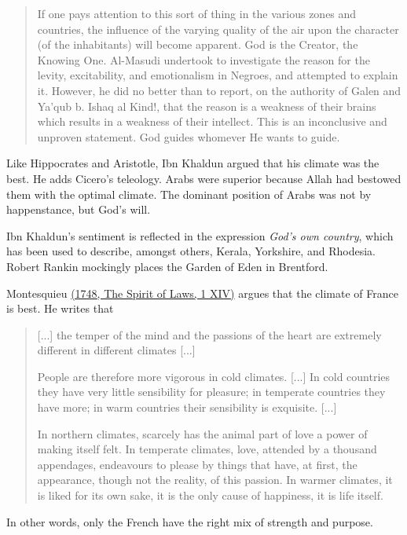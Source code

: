\begin{quote}
If one pays attention to this sort of thing in the various zones and countries, the influence of the varying quality of the air upon the character (of the inhabitants) will become apparent. God is the Creator, the Knowing One. Al-Masudi undertook to investigate the reason for the levity, excitability, and emotionalism in Negroes, and attempted to explain it. However, he did no better than to report, on the authority of Galen and Ya'qub b. Ishaq al Kind!, that the reason is a weakness of their brains which results in a weakness of their intellect. This is an inconclusive and unproven statement. God guides whomever He wants to guide.
\end{quote}
Like Hippocrates and Aristotle, Ibn Khaldun argued that his climate was the best. He adds Cicero's teleology. Arabs were superior because Allah had bestowed them with the optimal climate. The dominant position of Arabs was not by happenstance, but God's will.

Ibn Khaldun's sentiment is reflected in the expression \emph{God's own country}, which has been used to describe, amongst others, Kerala, Yorkshire, and Rhodesia. Robert Rankin mockingly places the Garden of Eden in Brentford.

Montesquieu \href{https://oll.libertyfund.org/titles/montesquieu-complete-works-vol-1-the-spirit-of-laws}{(1748, The Spirit of Laws, 1 XIV)} argues that the climate of France is best. He writes that
\begin{quote}
    [...] the temper of the mind and the passions of the heart are extremely different in different climates [...]
    
    People are therefore more vigorous in cold climates. [...] In cold countries they have very little sensibility for pleasure; in temperate countries they have more; in warm countries their sensibility is exquisite. [...]
    
    In northern climates, scarcely has the animal part of love a power of making itself felt. In temperate climates, love, attended by a thousand appendages, endeavours to please by things that have, at first, the appearance, though not the reality, of this passion. In warmer climates, it is liked for its own sake, it is the only cause of happiness, it is life itself.
\end{quote}
In other words, only the French have the right mix of strength and purpose.

